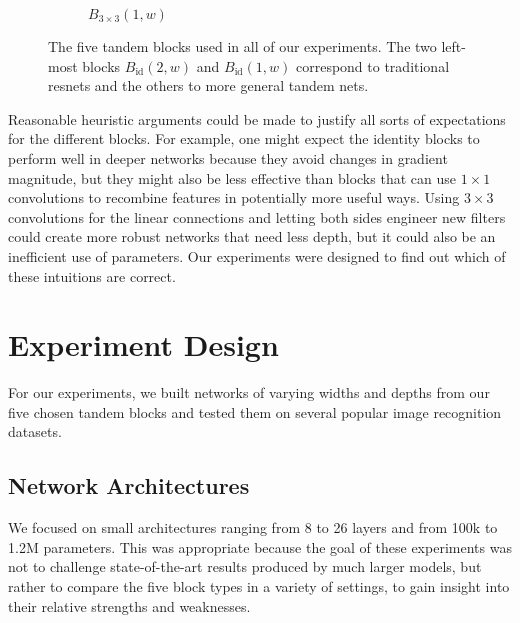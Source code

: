 \documentclass{article} %
\begin{document}
\begin{figure}[htb]
\begin{subfigure}[t]{.25\linewidth}
{}
		\captionsetup{width=.8\linewidth}
		\caption*{$B_{3\times 3}(1,w)$}%
	\end{subfigure}
	
	\caption{The five tandem blocks used in all of our experiments.  The two left-most blocks $B_{\operatorname{id}}(2,w)$ and $B_{\operatorname{id}}(1,w)$ correspond to traditional resnets and the others to more general tandem nets.}\label{fig:blocks}
\end{figure}

Reasonable heuristic arguments could be made to justify all sorts of expectations for the different blocks.
For example, one might expect the identity blocks to perform well in deeper networks because they avoid changes in gradient magnitude, but they might also be less effective than blocks that can use $1\times 1$ convolutions to recombine features in potentially more useful ways. Using $3\times 3$ convolutions for the linear connections and letting both sides engineer new filters could create more robust networks that need less depth, but it could also be an inefficient use of parameters. Our experiments were designed to find out which of these intuitions are correct.

\section{Experiment Design}

For our experiments, we built networks of varying widths and depths from our five chosen tandem blocks and tested them on several popular image recognition datasets.


\subsection{Network Architectures}
We focused on small architectures ranging from 8 to 26 layers and from 100k to 1.2M parameters. This was appropriate because the goal of these experiments was not to challenge state-of-the-art results produced by much larger models, but rather to compare the five block types in a variety of settings, to gain insight into their relative strengths and weaknesses.
\end{document}
